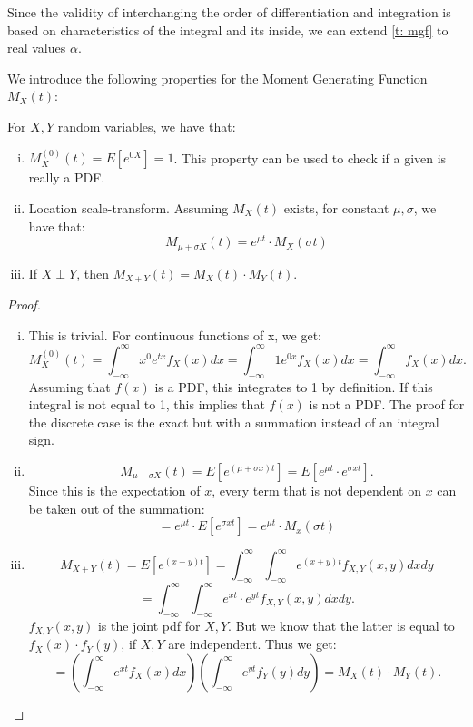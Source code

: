 \begin{remark}
    Since the validity of interchanging the order of differentiation and integration is based on characteristics of the integral and its inside, we can extend \autoref{t: mgf} to real values \(\alpha\).
\end{remark}

We introduce the following properties for the Moment Generating Function \(M_X(t)\):
\begin{proposition}
    For \(X, Y\) random variables, we have that:
    \begin{enumerate}[(i)]
        \item \(M_X^{(0)}(t) = E[e^{0X}] = 1\). This property can be used to check if a given is really a PDF.
        \item Location scale-transform. Assuming \(M_X(t)\) exists, for constant \(\mu, \sigma\), we have that: 
        \[M_{\mu + \sigma X}(t) = e^{\mu t} \cdot M_X(\sigma t)\]
        \item If \(X \perp Y\), then \(M_{X+Y}(t) = M_X(t)\cdot M_Y(t)\).
    \end{enumerate}
\end{proposition}

\begin{proof}
    \begin{enumerate}[(i)]
        \item This is trivial. For continuous functions of x, we get: 
        \[ M_X^{(0)}(t) = \int_{-\infty}^{\infty} x^0 e^{t x } f_X(x) dx = \int_{-\infty}^{\infty} 1 e^{0 x } f_X(x) dx = \int_{-\infty}^{\infty} f_X(x) dx.\] Assuming that \(f(x)\) is a PDF, this integrates to 1 by definition. If this integral is not equal to 1, this implies that \(f(x)\) is not a PDF. The proof for the discrete case is the exact but with a summation instead of an integral sign.
        \item \[M_{\mu + \sigma X}(t) = E[e^{(\mu + \sigma x)t}] = E[e^{\mu t} \cdot e^{\sigma x t}].\] Since this is the expectation of \(x\), every term that is not dependent on \(x\) can be taken out of the summation:
        \[ = e^{\mu t} \cdot E[e^{\sigma x t}] = e^{\mu t} \cdot M_{ x}(\sigma t)\]
        \item 
        \[M_{X+Y}(t) = E[e^{(x + y)t}] = \int_{-\infty}^{\infty} \int_{-\infty}^{\infty} e^{(x + y)t} f_{X, Y}(x, y) dx dy\] 
        \[= \int_{-\infty}^{\infty} \int_{-\infty}^{\infty} e^{xt} \cdot e^{yt} f_{X, Y}(x, y) dx dy.\] 
        \(f_{X, Y}(x, y)\) is the joint pdf for \(X, Y\). But we know that the latter is equal to \(f_X(x) \cdot f_Y(y)\), if \(X, Y\) are independent. Thus we get:
        \[ = (\int_{-\infty}^{\infty}  e^{xt} f_X(x) dx) (\int_{-\infty}^{\infty}  e^{yt} f_Y(y) dy) = M_X(t) \cdot M_Y(t).\] 
    \end{enumerate}
\end{proof}

